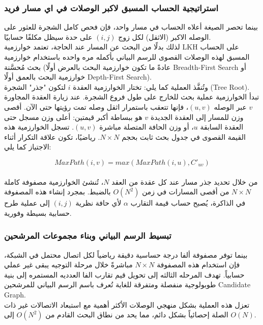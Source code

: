 \documentclass{article}
\newcommand{\en}[1]{\textenglish{#1}}
\begin{document}
\subsubsection{استراتيجية الحساب المسبق لاكبر الوصلات في اي مسار فريد}
بينما تحصر الصيغة أعلاه الحساب في مسار واحد، فإن فحص كامل الشجرة للعثور على الوصله الاكبر (الاثقل) لكل زوج $(i,j)$ على حدة سيظل مكلفًا حسابيًا.\\

لذلك بدلًا من البحث عن المسار عند الحاجة، تعتمد خوارزمية \en{LKH} على الحساب المسبق لهذه الوصلات القصوى للرسم البياني بأكمله مره واحده باستخدام خوارزمية بحث مُحسَّنة (عادةً ما تكون خوارزمية البحث بالعرض أولًا \en{Breadth-First Search} أو خوارزمية البحث بالعمق أولًا \en{Depth-First Search}).\\

وتُنفَّذ العملية كما يلي: تختار الخوارزمية العقدة $i$ لتكون "جذر" الشجرة (\en{Tree Root}). تبدأ الخوارزمية عملية بحث للخارج على طول فروع الشجرة. عند زيارة العقدة المجاورة $v$ عبر الوصله $(u,v)$، فإنها تتعقب باستمرار اثقل وصله تمت رؤيتها حتى الآن. أقصى وزن للمسار إلى العقدة الجديدة $v$ هو ببساطة أكبر قيمتين: أعلى وزن مسجل حتى العقدة السابقة $u$، أو وزن الحافة المتصلة مباشرة $(u,v)$. تسجل الخوارزمية هذه القيمة القصوى في جدول بحث ثابت بحجم $N \times N$. رياضيًا، تكون علاقة التكرار أثناء الاجتياز كما يلي:

{\LARGE$$
MaxPath(i,v) = max(MaxPath(i,u), C'_{uv})
$$}\\

من خلال تحديد جذر مسار عند كل عقدة من العقد $N$، تُنشئ الخوارزمية مصفوفة كاملة $N \times N$ من أقصى المسارات في زمن $O(N^2)$ بالضبط. بمجرد إنشاء هذه المصفوفة في الذاكرة، يُصبح حساب قيمة التقارب $\alpha$ لأي حافة نظرية $(i,j)$ إلى عملية طرح حسابية بسيطة وفورية.\\

\subsubsection{تبسيط الرسم البياني وبناء مجموعات المرشحين}
بينما توفر مصفوفة ألفا درجة حساسية دقيقة رياضياً لكل اتصال محتمل في الشبكة، فإن استخدام هذه المصفوفة $N \times N$ مباشرةً خلال مرحلة التوجيه يبقى غير عملي حسابياً. تهدف المرحله الثالثه إلى تحويل قيم تقارب الفا العدديه المستمره إلى بنية طوبولوجية منفصلة ومتفرقة للغاية تُعرف باسم الرسم البياني للمرشحين \en{Candidate Graph}.\\

تعزل هذه العملية بشكل منهجي الوصلات الأكثر أهمية مع استبعاد الاتصالات غير ذات الصلة إحصائياً بشكل دائم، مما يحد من نطاق البحث القادم من $O(N^2)$ إلى $O(N)$.\\
\end{document}

